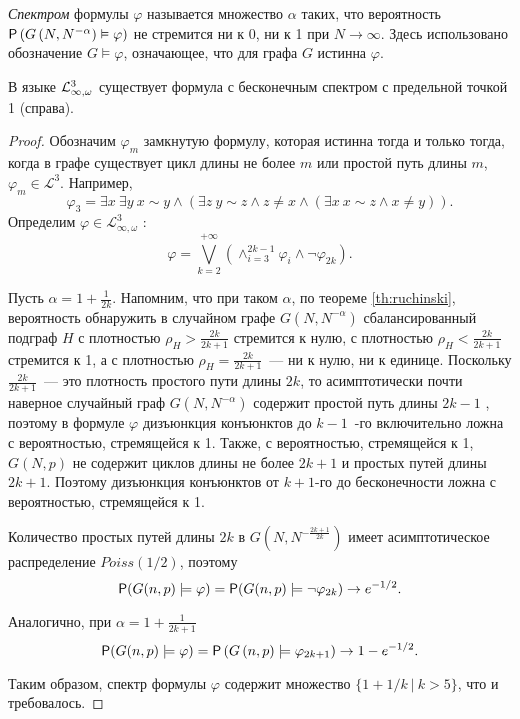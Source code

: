 
\Def \textit{Спектром} формулы $\varphi$ называется множество $\alpha$ таких, что вероятность $\P\left( G\left(N, N^{-\alpha}\right) \vDash \varphi  \right)$ не стремится ни к 0, ни к 1 при $N \rightarrow \infty$.
Здесь использовано обозначение $G \vDash \varphi$, означающее, что для графа $G$ истинна $\varphi$.

\begin{theorem}
В языке $\LL^3_{\infty, \omega}$ существует формула с бесконечным спектром с предельной точкой 1 (справа).
\end{theorem}
\begin{proof}
Обозначим $\varphi_m$ замкнутую формулу, которая истинна тогда и только тогда, когда в графе существует цикл длины не более $m$  или простой путь длины $m$,  $\varphi_m \in \mathcal{L}^3$. Например,
\[
\varphi_3 = \exists x ~\exists y ~
 x \sim y  \wedge \left( \exists z ~ y \sim z \wedge  z \neq x 
\wedge \left(\exists x ~ x \sim z \wedge x \neq y
\right) \right) .
\]
Определим $\varphi \in \mathcal{L}^3_{\infty, \omega}$ :
\[
\varphi = \bigvee_{k = 2}^{+\infty}\left(
\wedge_{i=3}^{2k-1} \varphi_{i}  \wedge \neg \varphi_{2k} \right).
\]

Пусть $\alpha = 1 + \frac{1}{2k}$.
Напомним, что при таком $\alpha$, по теореме \ref{th:ruchinski}, вероятность обнаружить в случайном графе $G(N, N^{-\alpha})$ сбалансированный подграф $H$ с плотностью $\rho_H > \frac{2k}{2k+1}$ стремится к нулю, с плотностью $\rho_H < \frac{2k}{2k+1}$ стремится к 1, а с плотностью $\rho_H = \frac{2k}{2k+1}$~--- ни к нулю, ни к единице.
Поскольку $\frac{2k}{2k+1}$~--- это плотность простого пути длины $2k$, то асимптотически почти наверное случайный граф $G(N, N^{-\alpha})$ содержит простой путь длины $2k-1$ , поэтому в формуле $\varphi$ дизъюнкция конъюнктов до $k-1$~-го включительно ложна с вероятностью, стремящейся к 1.
Также, с вероятностью, стремящейся к 1, $G(N, p)$ не содержит циклов длины не более $2k+1$ и простых путей длины $2k+1$.
Поэтому дизъюнкция конъюнктов от $k+1$-го до бесконечности ложна с вероятностью, стремящейся к 1.

Количество простых путей длины $2k$ в $G(N, N^{-\frac{2k+1}{2k}})$ имеет асимптотическое распределение $Poiss(1/2)$, поэтому
$$
\P(G(n, p) \models \varphi) = 
\P(G(n, p) \models \neg \varphi_{2k}) \rightarrow e^{-1/2}.
$$

Аналогично, при $\alpha = 1 + \frac{1}{2k+1}$ 
$$\P(G(n, p) \models \varphi) = 
\P\left(G\left(n, p \right) \models  \varphi_{2k+1}\right) \rightarrow 1 - e^{-1/2}.$$

Таким образом, спектр формулы $\varphi$ содержит множество $\{1 + 1/k ~|~ k > 5 \}$, что и требовалось.
\end{proof}
